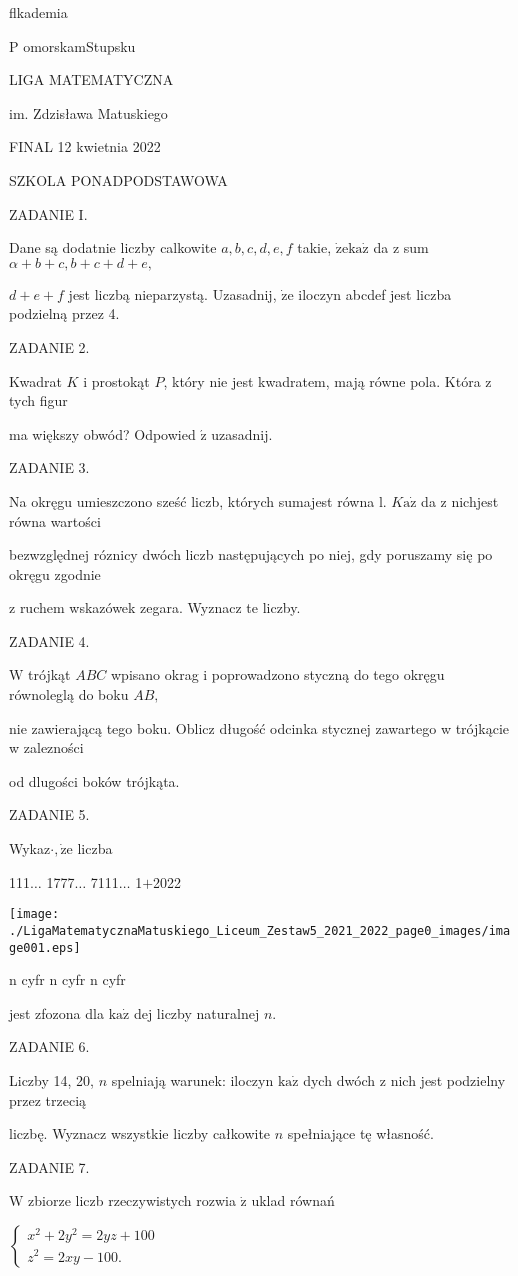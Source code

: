 \documentclass[a4paper,12pt]{article}
\begin{document}
flkademia

P omorskamStupsku

LIGA MATEMATYCZNA

im. Zdzisława Matuskiego

FINAL 12 kwietnia 2022

SZKOLA PONADPODSTAWOWA

ZADANIE I.

Dane są dodatnie liczby calkowite $a, b, c, d, e, f$ takie, $\dot{\mathrm{z}}\mathrm{e}\mathrm{k}\mathrm{a}\dot{\mathrm{z}}$ da z sum $\alpha+b+c, b+c+d+e,$

$d+e+f$ jest liczbą nieparzystą. Uzasadnij, $\dot{\mathrm{z}}\mathrm{e}$ iloczyn abcdef jest liczba podzielną przez 4.

ZADANIE 2.

Kwadrat $K$ i prostokąt $P$, który nie jest kwadratem, mają równe pola. Która z tych figur

ma większy obwód? Odpowied $\acute{\mathrm{z}}$ uzasadnij.

ZADANIE 3.

Na okręgu umieszczono sześć liczb, których sumajest równa l. $K\mathrm{a}\dot{\mathrm{z}}$ da z nichjest równa wartości

bezwzględnej róznicy dwóch liczb następujących po niej, gdy poruszamy się po okręgu zgodnie

z ruchem wskazówek zegara. Wyznacz te liczby.

ZADANIE 4.

$\mathrm{W}$ trójkąt $ABC$ wpisano okrag i poprowadzono styczną do tego okręgu równoleglą do boku $AB,$

nie zawierającą tego boku. Oblicz długość odcinka stycznej zawartego w trójkącie w zalezności

od dlugości boków trójkąta.

ZADANIE 5.

Wykaz$\cdot, \dot{\mathrm{z}}\mathrm{e}$ liczba

111$\ldots$ 1777$\ldots$ 7111$\ldots$ 1$+$2022
\begin{center}
\texttt{[image: ./LigaMatematycznaMatuskiego\_Liceum\_Zestaw5\_2021\_2022\_page0\_images/image001.eps]}
\end{center}
n cyfr n cyfr  n cyfr

jest zfozona dla $\mathrm{k}\mathrm{a}\dot{\mathrm{z}}$ dej liczby naturalnej $n.$

ZADANIE 6.

Liczby 14, 20, $n$ spelniają warunek: iloczyn $\mathrm{k}\mathrm{a}\dot{\mathrm{z}}$ dych dwóch z nich jest podzielny przez trzecią

liczbę. Wyznacz wszystkie liczby całkowite $n$ spełniające tę własność.

ZADANIE 7.

$\mathrm{W}$ zbiorze liczb rzeczywistych rozwia $\dot{\mathrm{z}}$ uklad równań

$\left\{\begin{array}{l}
x^{2}+2y^{2}=2yz+100\\
z^{2}=2xy-100.
\end{array}\right.$
\end{document}
